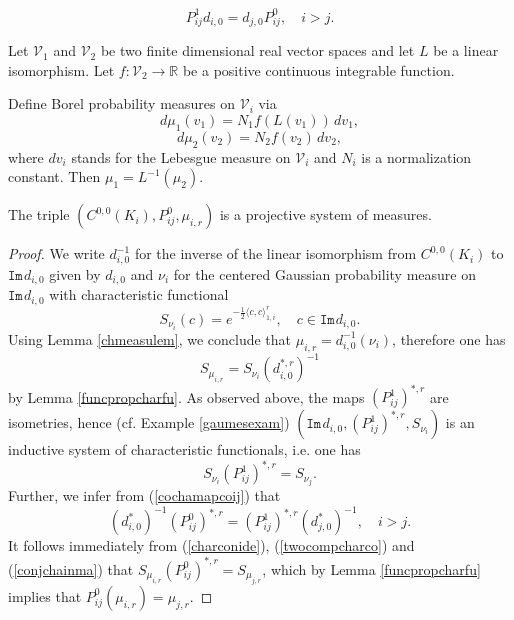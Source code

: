 \documentclass[10pt,a4paper]{amsart}
\begin{document}
\begin{equation}\label{cochamapcoij}
P^1_{ij}d_{i,0} =d_{j,0} P^0_{ij}, \quad i>j.
\end{equation}

\begin{lemma}\label{chmeasulem}
Let $\mathcal{V}_1$ and $\mathcal{V}_2$ be two finite dimensional real vector spaces and let $L$ be a linear isomorphism. Let $f: \mathcal{V}_2 \to \mathbb{R}$ be a positive continuous integrable function.

Define Borel probability measures on $\mathcal{V}_i$
via 
\[ d\mu_1(v_1) = N_1 f(L(v_1)) \, dv_1, \]
\[ d\mu_2(v_2) = N_2 f(v_2) \, dv_2, \]
where $dv_i$ stands for the Lebesgue measure on $\mathcal{V}_i$ and $N_i$ is a normalization constant. Then $\mu_1 = L^{-1}(\mu_2)$.
\end{lemma}

\begin{theorem}\label{mainprojsythe}
The triple $(C^{0,0}(K_i),P^0_{ij},\mu_{i,r})$ is a projective system of measures.
\end{theorem}

\begin{proof}
We write $d_{i,0}^{-1}$ for the inverse of the linear isomorphism from $C^{0,0}(K_i)$ to $\mathtt{Im}\hspace{1pt}d_{i,0}$ given by $d_{i,0}$ and $\nu_i$ for the centered Gaussian probability measure on $\mathtt{Im}\hspace{1pt}d_{i,0}$ with characteristic functional
$$S_{\nu_i} (c)=e^{-\frac{1}{2}\langle c, c \rangle_{1,i}^r},\quad c \in \mathtt{Im}\hspace{1pt}d_{i,0}.$$
Using Lemma \ref{chmeasulem}, we conclude that $\mu_{i,r}=d_{i,0}^{-1}(\nu_i)$, therefore one has
\begin{equation}\label{charconide}
S_{\mu_{i,r}} =S_{\nu_i}(d_{i,0}^{*,r})^{-1}
\end{equation}
by Lemma \ref{funcpropcharfu}. As observed above, the maps $(P^1_{ij})^{*,r}$ are isometries, hence (cf. Example \ref{gaumesexam}) $(\mathtt{Im}\hspace{1pt}d_{i,0},(P^1_{ij})^{*,r}, S_{\nu_i})$ is an inductive system of characteristic functionals, i.e. one has
\begin{equation}\label{twocompcharco}
	S_{\nu_{i}}(P^1_{ij})^{*,r} = S_{\nu_{j}}.
\end{equation}
Further, we infer from (\ref{cochamapcoij}) that
\begin{equation}\label{conjchainma}
(d_{i,0}^{*})^{-1}(P^0_{ij})^{*,r} 
= (P^1_{ij})^{*,r}(d_{j,0}^{*})^{-1}, \quad i>j.
\end{equation}
It follows immediately from (\ref{charconide}), (\ref{twocompcharco}) and (\ref{conjchainma}) that
$ S_{\mu_{i,r}}(P^0_{ij})^{*,r} = S_{\mu_{j,r}}$, which by Lemma \ref{funcpropcharfu} implies that 
$P^0_{ij}(\mu_{i,r})=\mu_{j,r}$.
\end{proof}
\end{document}
